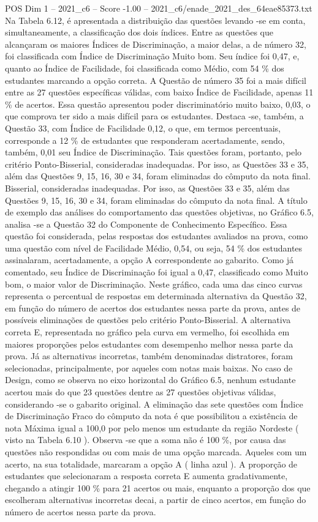 \begin{textsample}{POS Dim 1 – 2021\_c6 – Score -1.00 – 2021\_c6/enade\_2021\_des\_64eae85373.txt}
Na Tabela 6.12, é apresentada a distribuição das questões levando -se em conta, simultaneamente, a classificação dos dois índices.
Entre as questões que alcançaram os maiores Índices de Discriminação, a maior delas, a de número 32, foi classificada com Índice de Discriminação Muito bom.
Seu índice foi 0,47, e, quanto ao Índice de Facilidade, foi classificada como Médio, com 54 \% dos estudantes marcando a opção correta.
A Questão de número 35 foi a mais difícil entre as 27 questões específicas válidas, com baixo Índice de Facilidade, apenas 11 \% de acertos.
Essa questão apresentou poder discriminatório muito baixo, 0,03, o que comprova ter sido a mais difícil para os estudantes.
Destaca -se, também, a Questão 33, com Índice de Facilidade 0,12, o que, em termos percentuais, corresponde a 12 \% de estudantes que responderam acertadamente, sendo, também, 0,01 seu Índice de Discriminação.
Tais questões foram, portanto, pelo critério Ponto-Bisserial, consideradas inadequadas.
Por isso, as Questões 33 e 35, além das Questões 9, 15, 16, 30 e 34, foram eliminadas do cômputo da nota final.
Bisserial, consideradas inadequadas.
Por isso, as Questões 33 e 35, além das Questões 9, 15, 16, 30 e 34, foram eliminadas do cômputo da nota final.
A título de exemplo das análises do comportamento das questões objetivas, no Gráfico 6.5, analisa -se a Questão 32 do Componente de Conhecimento Específico.
Essa questão foi considerada, pelas respostas dos estudantes avaliados na prova, como uma questão com nível de Facilidade Médio, 0,54, ou seja, 54 \% dos estudantes assinalaram, acertadamente, a opção A correspondente ao gabarito.
Como já comentado, seu Índice de Discriminação foi igual a 0,47, classificado como Muito bom, o maior valor de Discriminação.
Neste gráfico, cada uma das cinco curvas representa o percentual de respostas em determinada alternativa da Questão 32, em função do número de acertos dos estudantes nessa parte da prova, antes de possíveis eliminações de questões pelo critério Ponto-Bisserial.
A alternativa correta E, representada no gráfico pela curva em vermelho, foi escolhida em maiores proporções pelos estudantes com desempenho melhor nessa parte da prova.
Já as alternativas incorretas, também denominadas distratores, foram selecionadas, principalmente, por aqueles com notas mais baixas.
No caso de Design, como se observa no eixo horizontal do Gráfico 6.5, nenhum estudante acertou mais do que 23 questões dentre as 27 questões objetivas válidas, considerando -se o gabarito original.
A eliminação das sete questões com Índice de Discriminação Fraco do cômputo da nota é que possibilitou a existência de nota Máxima igual a 100,0 por pelo menos um estudante da região Nordeste ( visto na Tabela 6.10 ).
Observa -se que a soma não é 100 \%, por causa das questões não respondidas ou com mais de uma opção marcada.
Aqueles com um acerto, na sua totalidade, marcaram a opção A ( linha azul ).
A proporção de estudantes que selecionaram a resposta correta E aumenta gradativamente, chegando a atingir 100 \% para 21 acertos ou mais, enquanto a proporção dos que escolheram alternativas incorretas decai, a partir de cinco acertos, em função do número de acertos nessa parte da prova.

\end{textsample}
